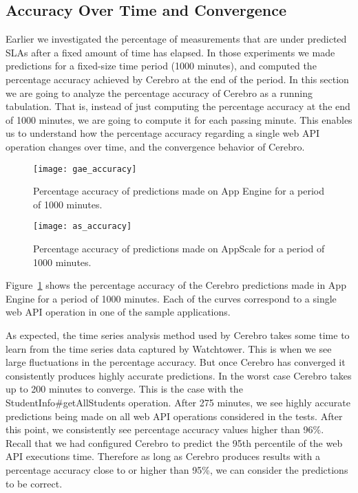 \subsection{Accuracy Over Time and Convergence}
Earlier we investigated the percentage of measurements that are under predicted SLAs after a fixed amount of time has elapsed.
In those experiments we made predictions for a fixed-size time period (1000 minutes), 
and computed the percentage accuracy achieved by Cerebro at the end of the period.
In this section we are going to analyze the percentage accuracy of Cerebro as a running tabulation. That is, instead of just
computing the percentage accuracy at the end of 1000 minutes, we are going to compute it for each passing minute. This enables us to
understand how the percentage accuracy regarding a single web API operation changes over time, and the convergence
behavior of Cerebro.

\begin{figure}
\centering
\texttt{[image: gae\_accuracy]}
\caption{Percentage accuracy of predictions made on App Engine for a period of 1000 minutes.}
\label{fig:gae_accuracy}
\end{figure}

\begin{figure}
\centering
\texttt{[image: as\_accuracy]}
\caption{Percentage accuracy of predictions made on AppScale for a period of 1000 minutes.}
\label{fig:as_accuracy}
\end{figure}

Figure~\ref{fig:gae_accuracy} shows the percentage accuracy of the Cerebro predictions made in App Engine 
for a period of 1000 minutes. Each of the curves correspond to a single web API operation in one of the 
sample applications. 

As expected, the time series analysis method used by Cerebro takes some time to learn
from the time series data captured by Watchtower. This is when we see large fluctuations in the percentage accuracy. But
once Cerebro has converged it consistently produces highly accurate predictions.
In the worst case Cerebro takes up to 200 minutes to converge. This is the case with the
StudentInfo\#getAllStudents operation. After 275 minutes, we see highly accurate predictions being made on all web API
operations considered in the tests. After this point, we consistently see percentage accuracy values higher than 96\%. Recall that
we had configured Cerebro to predict the 95th percentile of the web API executions time. Therefore as long as Cerebro produces
results with a percentage accuracy close to or higher than 95\%, we can consider the predictions to be correct.

